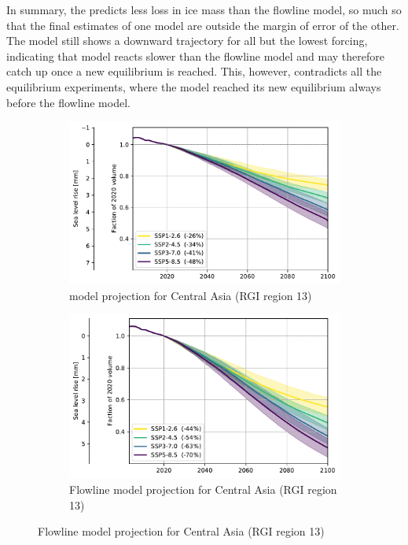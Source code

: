       In summary, the \vas{} predicts less loss in ice mass than the flowline model, so much so that the final estimates of one model are outside the margin of error of the other. The \vas{} model still shows a downward trajectory for all but the lowest forcing, indicating that \vas{} model reacts slower than the flowline model and may therefore catch up once a new equilibrium is reached. This, however, contradicts all the equilibrium experiments, where the \vas{} model reached its new equilibrium always before the flowline model.

      \begin{figure}[htp]

          \begin{subfigure}[b]{0.476\textwidth}
              \caption{\Vas{} model projection for Central Asia (RGI region 13) }
              \label{fig:cmip:vas_reg_13}
              \centering
              \includegraphics[width=\textwidth]{../plots/final_plots/time_series/cmip/cmip_vas_13.pdf}
          \end{subfigure}
          \hfill
          \begin{subfigure}[b]{0.476\textwidth}
              \caption{Flowline model projection for Central Asia (RGI region 13) }
              \label{fig:cmip:fl_reg_13}
              \centering
              \includegraphics[width=\textwidth]{../plots/final_plots/time_series/cmip/cmip_fl_13.pdf}
          \end{subfigure}


\end{figure}
